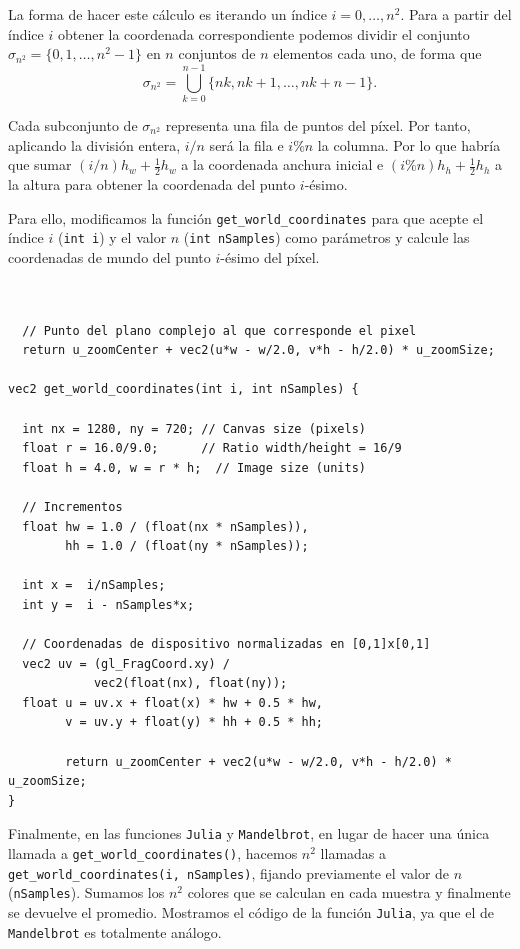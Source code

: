La forma de hacer este cálculo es iterando un índice $i=0,\dots,n^2$. Para a partir del índice $i$ obtener la coordenada correspondiente podemos dividir el conjunto $\sigma_{n^2}=\{0,1,\dots,n^2-1\}$ en $n$ conjuntos de $n$ elementos cada uno, de forma que
$$
\sigma_{n^2} = \bigcup_{k=0}^{n-1} \{nk, nk+1, \dots, nk+n-1\}.
$$

Cada subconjunto de $\sigma_{n^2}$ representa una fila de puntos del píxel. Por tanto, aplicando la división entera, $i/n$ será la fila e $i\%n$ la columna. Por lo que habría que sumar $(i/n)h_w + \frac{1}{2}h_w$ a la coordenada anchura inicial e $(i\%n)h_h+ \frac{1}{2}h_h$ a la altura para obtener la coordenada del punto $i$-ésimo.

Para ello, modificamos la función \verb|get_world_coordinates| para que acepte el índice $i$ (\verb|int i|) y el valor $n$ (\verb|int nSamples|) como parámetros y calcule las coordenadas de mundo del punto $i$-ésimo del píxel.

\begin{lstlisting}

  
  // Punto del plano complejo al que corresponde el pixel
  return u_zoomCenter + vec2(u*w - w/2.0, v*h - h/2.0) * u_zoomSize;

vec2 get_world_coordinates(int i, int nSamples) {

  int nx = 1280, ny = 720; // Canvas size (pixels)
  float r = 16.0/9.0;      // Ratio width/height = 16/9
  float h = 4.0, w = r * h;  // Image size (units) 

  // Incrementos
  float hw = 1.0 / (float(nx * nSamples)),
        hh = 1.0 / (float(ny * nSamples));

  int x =  i/nSamples;
  int y =  i - nSamples*x;

  // Coordenadas de dispositivo normalizadas en [0,1]x[0,1]
  vec2 uv = (gl_FragCoord.xy) / 
            vec2(float(nx), float(ny));
  float u = uv.x + float(x) * hw + 0.5 * hw,
        v = uv.y + float(y) * hh + 0.5 * hh;
  
        return u_zoomCenter + vec2(u*w - w/2.0, v*h - h/2.0) * u_zoomSize;
}
\end{lstlisting}

Finalmente, en las funciones \verb|Julia| y \verb|Mandelbrot|, en lugar de hacer una única llamada a \verb|get_world_coordinates()|, hacemos $n^2$ llamadas a \verb|get_world_coordinates(i, nSamples)|, fijando previamente el valor de $n$ (\verb|nSamples|). Sumamos los $n^2$ colores que se calculan en cada muestra y finalmente se devuelve el promedio. Mostramos el código de la función \verb|Julia|, ya que el de \verb|Mandelbrot| es totalmente análogo.

